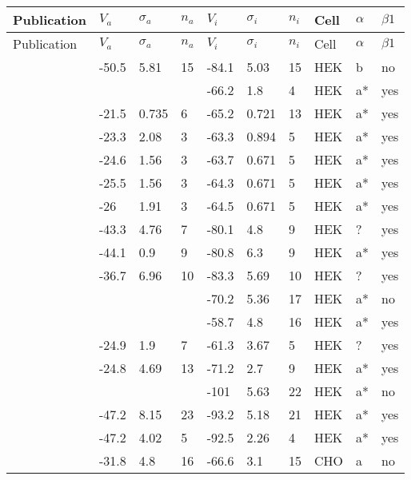 \startrowcolors
\begin{longtable}{p{5cm}|lll|lll|lll}
\hline
Publication & $V_a$ & $\sigma_a$  & $n_a$ & $V_i$ & $\sigma_i$  & $n_i$ & Cell & $\alpha$ & $\beta1$ \\
\hline
\endfirsthead
\hline
\rowcolor{white}
Publication & $V_a$ & $\sigma_a$  & $n_a$ & $V_i$ & $\sigma_i$  & $n_i$ & Cell & $\alpha$ & $\beta1$ \\
\hline
\endhead
\hline
\endfoot
\citet{Abe2014MutationDB} & -50.5 & 5.81 & 15 & -84.1 & 5.03 & 15 & HEK & b & no \\
\citet{Abriel2000MutationDB} & && & -66.2 & 1.8 & 4 & HEK & a* & yes \\
\citet{Abriel2001MutationDB} & -21.5 & 0.735 & 6 & -65.2 & 0.721 & 13 & HEK & a* & yes \\
\citet{Abriel2001MutationDB} & -23.3 & 2.08 & 3 & -63.3 & 0.894 & 5 & HEK & a* & yes \\
\citet{Abriel2001MutationDB} & -24.6 & 1.56 & 3 & -63.7 & 0.671 & 5 & HEK & a* & yes \\
\citet{Abriel2001MutationDB} & -25.5 & 1.56 & 3 & -64.3 & 0.671 & 5 & HEK & a* & yes \\
\citet{Abriel2001MutationDB} & -26 & 1.91 & 3 & -64.5 & 0.671 & 5 & HEK & a* & yes \\
\citet{Aiba2014MutationDB} & -43.3 & 4.76 & 7 & -80.1 & 4.8 & 9 & HEK & ? & yes \\
\citet{Akai2000MutationDB} & -44.1 & 0.9 & 9 & -80.8 & 6.3 & 9 & HEK & a* & yes \\
\citet{Amin2005MutationDB} & -36.7 & 6.96 & 10 & -83.3 & 5.69 & 10 & HEK & ? & yes \\
\citet{An1998MutationDB} & && & -70.2 & 5.36 & 17 & HEK & a* & no \\
\citet{An1998MutationDB} & && & -58.7 & 4.8 & 16 & HEK & a* & yes \\
\citet{Bankston2007aMutationDB} & -24.9 & 1.9 & 7 & -61.3 & 3.67 & 5 & HEK & ? & yes \\
\citet{Bankston2007bMutationDB} & -24.8 & 4.69 & 13 & -71.2 & 2.7 & 9 & HEK & a* & yes \\
\citet{Baroudi2000aMutationDB} & && & -101 & 5.63 & 22 & HEK & a* & no \\
\citet{Baroudi2000bMutationDB} & -47.2 & 8.15 & 23 & -93.2 & 5.18 & 21 & HEK & a* & yes \\
\citet{Baroudi2001MutationDB} & -47.2 & 4.02 & 5 & -92.5 & 2.26 & 4 & HEK & a* & yes \\
\citet{Bebarova2008MutationDB} & -31.8 & 4.8 & 16 & -66.6 & 3.1 & 15 & CHO & a & no \\

\end{longtable}
